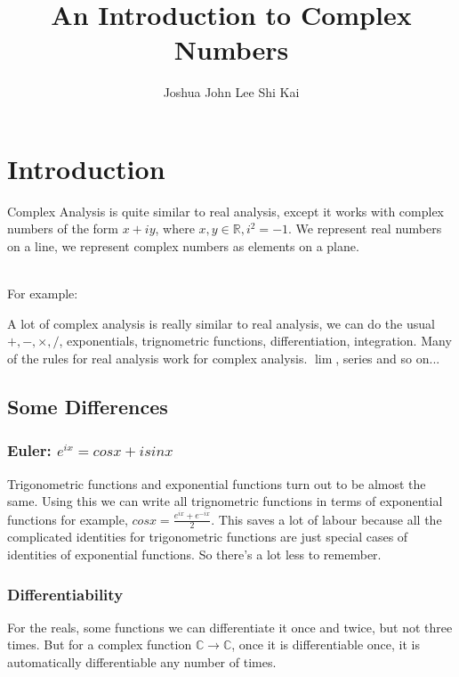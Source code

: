 \documentclass{article}
\title{An Introduction to Complex Numbers}
\author{Joshua John Lee Shi Kai}
\begin{document}
\maketitle
\tableofcontents

\newpage
\section{Introduction}
Complex Analysis is quite similar to real analysis, except it works with complex numbers of the form
$x + iy$, where $x, y \in \mathbb{R}, i^2 = -1$. We represent real numbers on a line, we represent complex
numbers as elements on a plane.

\noindent \\ For example:
\begin{center}

\end{center}

\noindent A lot of complex analysis is really similar to real analysis, we can do the usual $+, -, \times, /$,
exponentials, trignometric functions, differentiation, integration. Many of the rules for real analysis work for
complex analysis. $\lim$, series and so on...

\subsection{Some Differences}
\subsubsection{Euler: $e^{ix} = cosx + isinx$}
Trigonometric functions and exponential functions turn out to be almost the same.
Using this we can write all trignometric functions in terms of exponential functions for example,
$cosx = \frac{e^{ix} + e^{-ix}}{2}$. This saves a lot of labour because all the complicated identities
for trigonometric functions are just special cases of identities of exponential functions. So there's a lot
less to remember.
\subsubsection{Differentiability}
For the reals, some functions we can differentiate it once and twice, but not three times. But for a
complex function $\mathbb{C} \rightarrow \mathbb{C}$, once it is differentiable once, it is automatically
differentiable any number of times.
\end{document}

